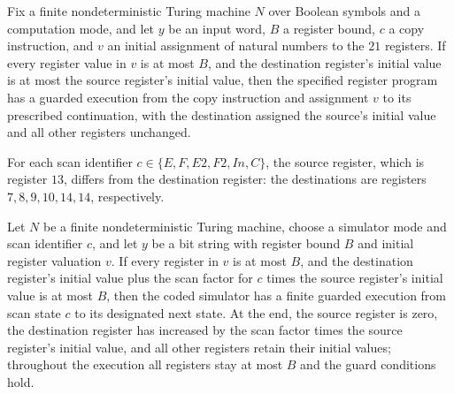 \begin{theorem}
\label{Complexity.Codec.cp_run}
\leanok
{}
Fix a finite nondeterministic Turing machine $N$ over Boolean symbols and a computation
mode, and let $y$ be an input word, $B$ a register bound, $c$ a copy instruction, and
$v$ an initial assignment of natural numbers to the $21$ registers. If every register
value in $v$ is at most $B$, and the destination register's initial value is at most the
source register's initial value, then the specified register program has a guarded
execution from the copy instruction and assignment $v$ to its prescribed continuation,
with the destination assigned the source's initial value and all other registers
unchanged.
\end{theorem}

\begin{lemma}
\label{Complexity.Codec.scSrc_ne}
\leanok
{}
For each scan identifier $c\in\{E,F,E2,F2,In,C\}$, the source register, which is
register $13$, differs from the destination register: the destinations are registers
$7,8,9,10,14,14$, respectively.
\end{lemma}

\begin{theorem}
\label{Complexity.Codec.sc_run}
\leanok
{}
Let $N$ be a finite nondeterministic Turing machine, choose a simulator mode and scan
identifier $c$, and let $y$ be a bit string with register bound $B$ and initial register
valuation $v$. If every register in $v$ is at most $B$, and the destination register's
initial value plus the scan factor for $c$ times the source register's initial value is
at most $B$, then the coded simulator has a finite guarded execution from scan state $c$
to its designated next state. At the end, the source register is zero, the destination
register has increased by the scan factor times the source register's initial value, and
all other registers retain their initial values; throughout the execution all registers
stay at most $B$ and the guard conditions hold.
\end{theorem}

